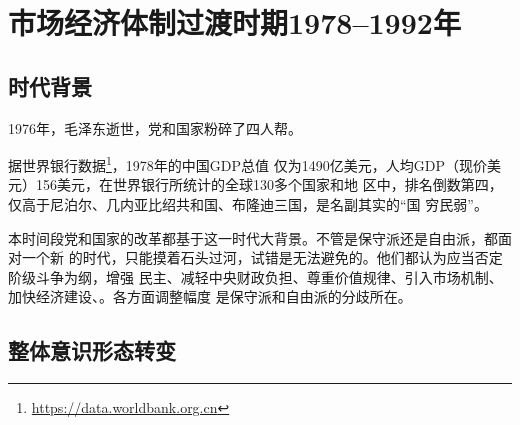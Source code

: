 \chapter{市场经济体制过渡时期1978--1992年}
\label{chap:1978}

\section{时代背景}


1976年，毛泽东逝世，党和国家粉碎了四人帮。

据世界银行数据\footnote{\url{https://data.worldbank.org.cn}}，1978年的中国GDP总值
仅为1490亿美元，人均GDP（现价美元）156美元，在世界银行所统计的全球130多个国家和地
区中，排名倒数第四，仅高于尼泊尔、几内亚比绍共和国、布隆迪三国，是名副其实的“国
穷民弱”。

本时间段党和国家的改革都基于这一时代大背景。不管是保守派还是自由派，都面对一个新
的时代，只能摸着石头过河，试错是无法避免的。他们都认为应当否定阶级斗争为纲，增强
民主、减轻中央财政负担、尊重价值规律、引入市场机制、加快经济建设、。各方面调整幅度
是保守派和自由派的分歧所在。


\section{整体意识形态转变}


